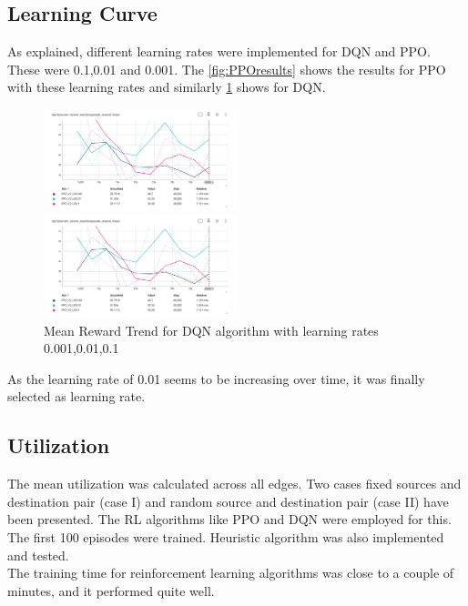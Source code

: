 \documentclass[conference]{IEEEtran}
\begin{document}
\subsection{Learning Curve}

As explained, different learning rates were implemented for DQN and PPO. These were 0.1,0.01 and 0.001. The \ref{fig:PPOresults} shows the results for PPO with these learning rates and similarly \ref{fig:DQNresults} shows for DQN.

\begin{figure}[ht]
  \centering
   \includegraphics[width=0.5\textwidth]{PPO.png}
  \caption{Mean Reward Trend for PPO algorithm with learning rates 0.001,0.01,0.1}
  \label{fig:PPOresults}



  \centering
   \includegraphics[width=0.5\textwidth]{PPO.png}
  \caption{Mean Reward Trend for DQN algorithm with learning rates 0.001,0.01,0.1}
  \label{fig:DQNresults}
\end{figure}

As the learning rate of 0.01 seems to be increasing over time, it was finally selected as learning rate.


\subsection{Utilization}

The mean utilization was calculated across all edges. Two cases fixed sources and destination pair (case I) and random source and destination pair (case II) have been presented. The RL algorithms like PPO and DQN were employed for this. The first 100 episodes were trained. Heuristic algorithm was also implemented and tested. \\
The training time for reinforcement learning algorithms was close to a couple of minutes, and it performed quite well.
\end{document}

